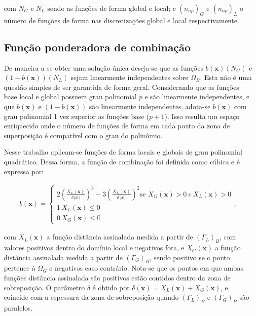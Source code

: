 \documentclass[tese_patricia]{subfiles}
\begin{document}
\noindent com $N_{G}$ e $N_{L}$ sendo as fun\c{c}\~oes de forma global e local; e $(n_{np})_G$ e $(n_{np})_L$ o n\'umero de fun\c{c}\~oes de forma nas discretiza\c{c}\~oes global e local respectivamente. 

\subsection{Função ponderadora de combinação}

De maneira a se obter uma solu\c{c}\~ao  \'unica deseja-se que as fun\c{c}\~oes $b(\mathbf{x})(N_{G})$ e $(1-b(\mathbf{x}))(N_{L})$ sejam linearmente independentes sobre $\Omega_{B}$. Esta não é uma questão simples de ser garantida de forma geral. Considerando que as fun\c{c}\~oes base local e global possuem grau polinomial $p$ e s\~ao linearmente independentes, e que $b(\mathbf{x})$ e $(1-b(\mathbf{x}))$ s\~ao linearmente independentes, adota-se $b(\mathbf{x})$ com grau polinomial 1 vez superior as fun\c{c}\~oes base ($p+1$). Isso resulta um espaço enriquecido onde o número de funções de forma em cada ponto da zona de superposição é compatível com o grau do polinômio.  

Nesse trabalho aplicam-se funções de forma locais e globais de grau polinomial quadrático. Dessa forma, a função de combinação foi definida como cúbica e é expressa por:

\begin{align}
b(\mathbf{x}) =  \begin{cases} 2\left(\frac{X_{L}(\mathbf{x})}{\delta\mathbf(x)}\right)^3  -   3\left(\frac{X_{L}(\mathbf{x})}{\delta\mathbf(x)}\right)^2   \mbox{se } X_{G}(\mathbf{x})> 0 \ e \ X_{L}(\mathbf{x})> 0 \\
1  \ X_{L}(\mathbf{x}) \leq 0  \\
0  \ X_{G}(\mathbf{x}) \leq 0 \end{cases},
\end{align}

\noindent com $X_{L}(\mathbf{x})$ a função distância assinalada medida a partir de $(\Gamma_{L})_{B}$, com valores positivos dentro do domínio local e negativos fora, e $X_{G}(\mathbf{x})$ a função distância assinalada medida a partir de $(\Gamma_{G})_{B}$, sendo positivo se o ponto pertence à $\Omega_{G}$ e negativos caso contr\'ario. Nota-se que os pontos em que ambas funções distância assinalada são positivos estão contidos dentro da zona de sobreposição. O parâmetro $\delta$ \'e obtido por $\delta(\mathbf{x}) = X_{L}(\mathbf{x}) + X_{G}(\mathbf{x})$, e coincide com a espessura da zona de sobreposi\c{c}\~ao quando $(\Gamma_{L})_{B}$ e $(\Gamma_{G})_{B}$ s\~ao paralelos.
\end{document}
